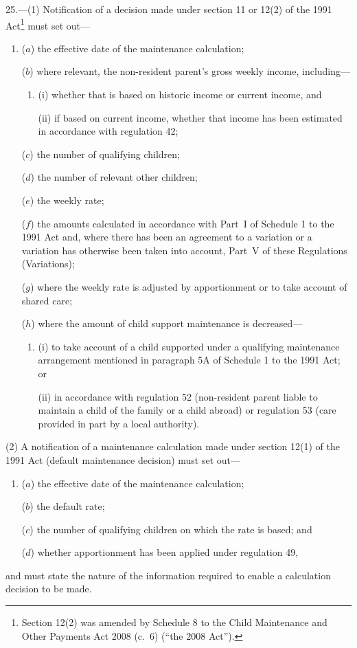 \documentclass[12pt,a4paper]{article}
\begin{document}
25.---(1)  Notification of a decision made under section 11 or 12(2) of the 1991 Act\footnote{Section 12(2) was amended by Schedule 8 to the Child Maintenance and Other Payments Act 2008 (c.~6) (“the 2008 Act”).} must set out—
\begin{enumerate}\item[]
($a$) the effective date of the maintenance calculation;

($b$) where relevant, the non-resident parent’s gross weekly income, including—
\begin{enumerate}\item[]
(i) whether that is based on historic income or current income, and

(ii) if based on current income, whether that income has been estimated in accordance with regulation 42;
\end{enumerate}

($c$) the number of qualifying children;

($d$) the number of relevant other children;

($e$) the weekly rate;

($f$) the amounts calculated in accordance with Part~I of Schedule 1 to the 1991 Act and, where there has been an agreement to a variation or a variation has otherwise been taken into account, Part~V of these Regulations (Variations);

($g$) where the weekly rate is adjusted by apportionment or to take account of shared care;

($h$) where the amount of child support maintenance is decreased—
\begin{enumerate}\item[]
(i) to take account of a child supported under a qualifying maintenance arrangement mentioned in paragraph 5A of Schedule 1 to the 1991 Act; or

(ii) in accordance with regulation 52 (non-resident parent liable to maintain a child of the family or a child abroad) or regulation 53 (care provided in part by a local authority).
\end{enumerate}
\end{enumerate}

(2) A notification of a maintenance calculation made under section 12(1) of the 1991 Act (default maintenance decision) must set out—
\begin{enumerate}\item[]
($a$) the effective date of the maintenance calculation;

($b$) the default rate;

($c$) the number of qualifying children on which the rate is based; and

($d$) whether apportionment has been applied under regulation 49,
\end{enumerate}
and must state the nature of the information required to enable a calculation decision to be made.
\end{document}
